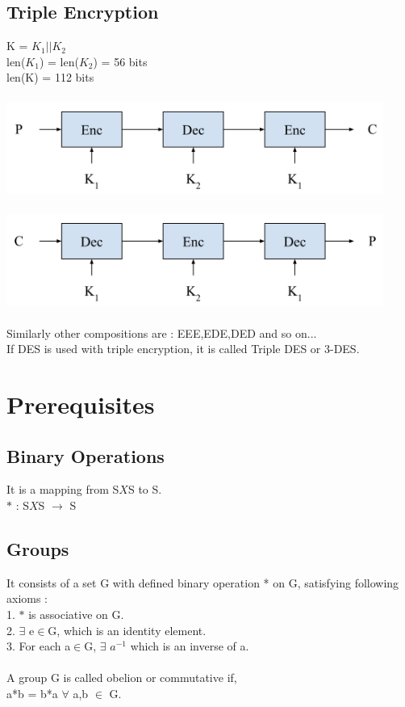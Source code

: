 \documentclass[11pt]{article}
\begin{document}
\subsection*{Triple Encryption}
K = $K_{1} || K_{2}$ \\
len($K_{1}$) = len($K_{2}$) = 56 bits \\
len(K) = 112 bits \\ \\
\includegraphics[width=350pt]{p3.png} \\ \\
\includegraphics[width=350pt]{p4.png} \\ \\
Similarly other compositions are : EEE,EDE,DED and so on... \\ 
If DES is used with triple encryption, it is called Triple DES or 3-DES. 

\section*{Prerequisites}
\subsection*{Binary Operations}
It is a mapping from S$X$S to S. \\
$*$ : S$X$S $\rightarrow$ S

\subsection*{Groups}
It consists of a set G with defined binary operation * on G, satisfying following axioms : \\
 1. $*$ is associative on G. \\
 2. $\exists$ e$\in$G, which is an identity element. \\
 3. For each a$\in$G, $\exists$ $a^{-1}$ which is an inverse of a. \\ \\
 A group G is called obelion or commutative if, \\
 a*b = b*a $\forall$ a,b $\in$ G.
 
\end{document}

